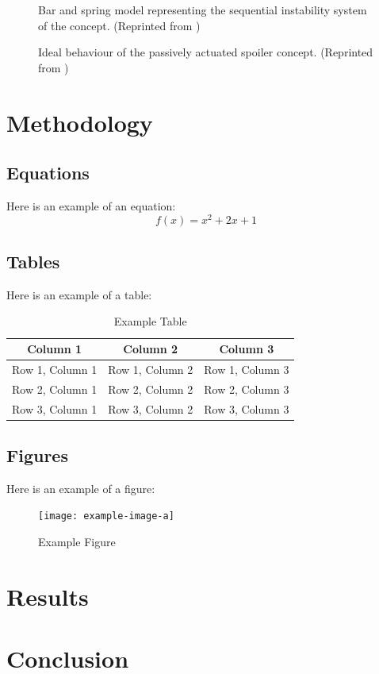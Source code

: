 \documentclass{IEEEtran}
\begin{document}
		\begin{figure}[!h]
			\centering
			
			\caption{Bar and spring model representing the sequential instability system of the concept. (Reprinted from \cite{Wheatcroft_2023})}
			\label{fig:BarNSpring}
		\end{figure}
	
		\begin{figure}[!h]
			\centering
			
			\caption{Ideal behaviour of the passively actuated spoiler concept. (Reprinted from \cite{Wheatcroft_2023})}
			\label{fig:DesiredPath}
		\end{figure}
	
		
	\section{Methodology}
		
	\subsection{Equations}
	Here is an example of an equation:
	\begin{equation}
		f(x) = x^2 + 2x + 1
	\end{equation}
	
	\subsection{Tables}
	Here is an example of a table:
	\begin{table}[htbp]
		\centering
		\caption{Example Table}
		\label{tab:example}
		\begin{tabular}{|c|c|c|}
			\hline
			\textbf{Column 1} & \textbf{Column 2} & \textbf{Column 3} \\
			\hline
			Row 1, Column 1 & Row 1, Column 2 & Row 1, Column 3 \\
			\hline
			Row 2, Column 1 & Row 2, Column 2 & Row 2, Column 3 \\
			\hline
			Row 3, Column 1 & Row 3, Column 2 & Row 3, Column 3 \\
			\hline
		\end{tabular}
	\end{table}
	
	\subsection{Figures}
	Here is an example of a figure:
	\begin{figure}[htbp]
		\centering
		\texttt{[image: example-image-a]}
		\caption{Example Figure}
		\label{fig:example}
	\end{figure}
	
	\section{Results}
	
	\section{Conclusion}
	
	
    \printbibliography
	
\end{document}
